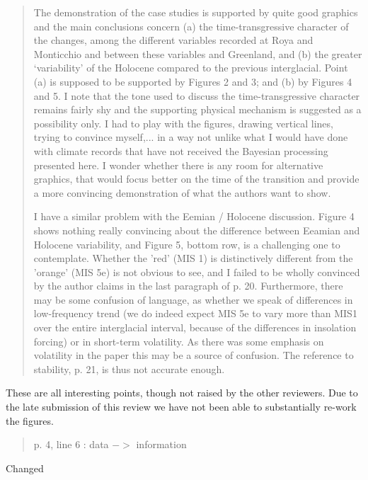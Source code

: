 \documentclass[a4paper,11pt]{article}
\begin{document}
\begin{framed} \begin{quote}
The demonstration of the case studies is supported by quite good graphics and the main conclusions concern (a) the time-transgressive character of the changes, among the different variables recorded at Roya and Monticchio and between these variables and Greenland, and (b) the greater `variability' of the Holocene compared to the previous interglacial. Point (a) is supposed to be supported by Figures 2 and 3; and (b) by Figures 4 and 5. I note that the tone used to discuss the time-transgressive character remains fairly shy and the supporting physical mechanism is suggested as a possibility only. I had to play with the figures, drawing vertical lines, trying to convince myself,... in a way not unlike what I would have done with climate records that have not received the Bayesian processing presented here. I wonder whether there is any room for alternative graphics, that would focus better on the time of the transition and provide a more convincing demonstration of what the authors want to show. 

I have a similar problem with the Eemian / Holocene discussion. Figure 4 shows nothing really convincing about the difference between Eeamian and Holocene variability, and Figure 5, bottom row, is a challenging one to contemplate. Whether the 'red' (MIS 1) is distinctively different from the 'orange' (MIS 5e) is not obvious to see, and I failed to be wholly convinced by the author claims in the last paragraph of p. 20.  Furthermore, there may be some confusion of language, as whether we speak of differences in low-frequency trend (we do indeed expect MIS 5e to vary more than MIS1 over the entire interglacial interval, because of the differences in insolation forcing) or in short-term volatility. As there was some emphasis on volatility in the paper this may be a source of confusion. The reference to stability, p. 21, is thus not accurate enough. 
\end{quote} \end{framed}

These are all interesting points, though not raised by the other reviewers. Due to the late submission of this review we have not been able to substantially re-work the figures.

\begin{framed} \begin{quote}
p. 4, line 6 : data $->$ information
\end{quote} \end{framed}
Changed
\end{document}
